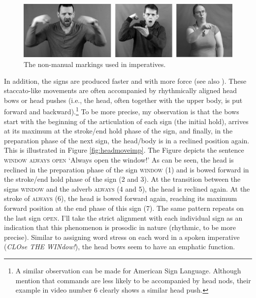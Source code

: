 \begin{figure}[bt]
\centering
	\includegraphics[width=1.0\textwidth]{imperativefacialexpressionsw.jpg}
	\caption{The non-manual markings used in imperatives.}
	\label{fig:imperativefacial}
\end{figure} 

In addition, the signs are produced faster and with more force (see also \citealt[341]{happ2014vork}). These staccato-like movements are often accompanied by rhythmically aligned head bows or head pushes (i.e., the head, often together with the upper body, is put forward and backward).\footnote{ A similar observation can be made for American Sign Language. Although \citet{brentari2018production} mention that commands are less likely to be accompanied by head nods, their example in video number 6 clearly shows a similar head push.} To be more precise, my observation is that the bows start with the beginning of the articulation of each sign (the initial hold), arrives at its maximum at the stroke/end hold phase of the sign, and finally, in the preparation phase of the next sign, the head/body is in a reclined position again. This is illustrated in Figure \ref{fig:headmoveimp}. The Figure depicts the sentence \textsc{window always open} `Always open the window!' As can be seen, the head is reclined in the preparation phase of the sign \textsc{window} (1) and is bowed forward in the stroke/end hold phase of the sign (2 and 3). At the transition between the signs \textsc{window} and the adverb \textsc{always} (4 and 5), the head is reclined again.  At the stroke of \textsc{always} (6), the head is bowed forward again, reaching its maximum forward position at the end phase of this sign (7). The same pattern repeats on the last sign \textsc{open}. I'll take the strict alignment with each individual sign as an indication that this phenomenon is prosodic in nature (rhythmic, to be more precise). Similar to assigning word stress on each word in a spoken imperative (\textit{CLOse THE WINdow!}), the head bows seem to have an emphatic function.%


